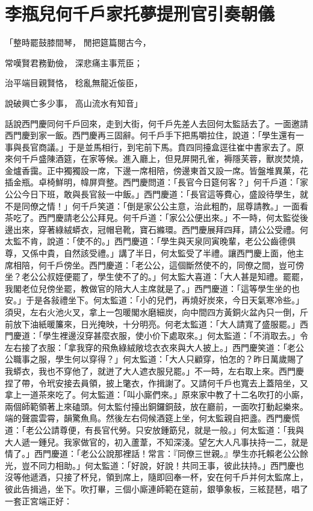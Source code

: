 %

\chapter{李瓶兒何千戶家托夢\KG 提刑官引奏朝儀}


「整時罷鼓膝間琴，  閒把筵篇閱古今，

常嘆賢君務勤儉，  深悲痛主事荒臣；

治平端目親賢恪，  稔亂無龍近侫臣，

說破興亡多少事，  高山流水有知音」

話說西門慶同何千戶回來，走到大街，何千戶先差人去回何太監話去了。一面邀請西門慶到家一飯。西門慶再三固辭。何千戶手下把馬嚼拉住，說道：「學生還有一事與長官商議。」于是並馬相行，到宅前下馬。賁四同擡盒逕往崔中書家去了。原來何千戶盛陳酒筵，在家等候。進入廳上，但見屏開孔雀，褥隱芙蓉，獸炭焚燒，金爐香靄。正中獨獨設一席，下邊一席相陪，傍邊東首又設一席。皆盤堆異菓，花插金瓶。卓椅鮮明，幃屏齊整。西門慶問道：「長官今日筵何客？」何千戶道：「家公公今日下班，敢與長官敍一中飯。」西門慶道：「長官這等費心，盛設待學生，就不是同僚之情！」何千戶笑道：「倒是家公公主意，治此粗酌，屈尊請教。」一面看茶吃了。西門慶請老公公拜見。何千戶道：「家公公便出來。」不一時，何太監從後邊出來，穿著綠絨蟒衣，冠帽皂靴，寶石縧環。西門慶展拜四拜，請公公受禮。何太監不肯，說道：「使不的。」西門慶道：「學生與天泉同寅晚輩，老公公齒德俱尊，又係中貴，自然該受禮。」講了半日，何太監受了半禮。讓西門慶上面，他主席相陪，何千戶傍坐。西門慶道：「老公公，這個斷然使不的，同僚之間，豈可傍坐？老公公叔姪便罷了，學生使不了的。」何太監大喜道：「大人甚是知禮。罷罷，我閣老位兒傍坐罷，教做官的陪大人主席就是了。」西門慶道：「這等學生坐的也安。」于是各敍禮坐下。何太監道：「小的兒們，再燒好炭來，今日天氣寒冷些。」須臾，左右火池火叉，拿上一包暖閣水磨細炭，向中間四方黃銅火盆內只一倒，斤前放下油紙暖簾來，日光掩映，十分明亮。何老太監道：「大人請寬了盛服罷。」西門慶道：「學生裡邊沒穿甚麼衣服，使小价下處取來。」何太監道：「不消取去。」令左右接了衣服：「拿我穿的飛魚綠絨敞埝衣衣來與大人披上。」西門慶笑道：「老公公職事之服，學生何以穿得？」何太監道：「大人只顧穿，怕怎的？昨日萬歲賜了我蟒衣，我也不穿他了，就迸了大人遮衣服兒罷。」不一時，左右取上來。西門慶捏了帶，令玳安接去員領，披上氅衣，作揖謝了。又請何千戶也寬去上蓋陪坐，又拿上一道茶來吃了。何太監道：「叫小廝們來。」原來家中教了十二名吹打的小廝，兩個師範領著上來磕頭。何太監付擡出銅鑼銅鼓，放在廳前，一面吹打動起樂來。端的聲震雲霄，韻驚魚鳥。然後左右伺候酒筵上坐，何太監親自把盞。西門慶慌道：「老公公請尊便，有長官代勞。只安放鍾筯兒，就是一般。」何太監道：「我與大人遞一鍾兒。我家做官的，初入蘆葦，不知深淺。望乞大人凡事扶持一二，就是情了。」西門慶道：「老公公說那裡話！常言：『同僚三世親。』學生亦托賴老公公餘光，豈不同力相助。」何太監道：「好說，好說！共同王事，彼此扶持。」西門慶也沒等他遞酒，只接了杯兒，領到席上，隨即回奉一杯，安在何千戶并何太監席上，彼此告揖過，坐下。吹打畢，三個小廝連師範在筵前，銀箏象板，三絃琵琶，唱了一套正宮端正好：

